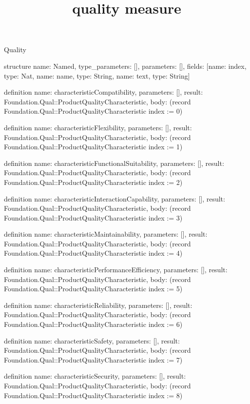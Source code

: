 \begin{lexlean}{Quality}
\title{quality measure}
\begin{semanticmodule}
structure{
  name: Named,
  type_parameters: [],
  parameters: [],
  fields: [{name: index, type: Nat}, {name: name, type: String}, {name: text, type: String}]
}

definition{
  name: characteristicCompatibility,
  parameters: [],
  result: Foundation.Qual::ProductQualityCharacteristic,
  body: (record Foundation.Qual::ProductQualityCharacteristic {index := 0})
}

definition{
  name: characteristicFlexibility,
  parameters: [],
  result: Foundation.Qual::ProductQualityCharacteristic,
  body: (record Foundation.Qual::ProductQualityCharacteristic {index := 1})
}

definition{
  name: characteristicFunctionalSuitability,
  parameters: [],
  result: Foundation.Qual::ProductQualityCharacteristic,
  body: (record Foundation.Qual::ProductQualityCharacteristic {index := 2})
}

definition{
  name: characteristicInteractionCapability,
  parameters: [],
  result: Foundation.Qual::ProductQualityCharacteristic,
  body: (record Foundation.Qual::ProductQualityCharacteristic {index := 3})
}

definition{
  name: characteristicMaintainability,
  parameters: [],
  result: Foundation.Qual::ProductQualityCharacteristic,
  body: (record Foundation.Qual::ProductQualityCharacteristic {index := 4})
}

definition{
  name: characteristicPerformanceEfficiency,
  parameters: [],
  result: Foundation.Qual::ProductQualityCharacteristic,
  body: (record Foundation.Qual::ProductQualityCharacteristic {index := 5})
}

definition{
  name: characteristicReliability,
  parameters: [],
  result: Foundation.Qual::ProductQualityCharacteristic,
  body: (record Foundation.Qual::ProductQualityCharacteristic {index := 6})
}

definition{
  name: characteristicSafety,
  parameters: [],
  result: Foundation.Qual::ProductQualityCharacteristic,
  body: (record Foundation.Qual::ProductQualityCharacteristic {index := 7})
}

definition{
  name: characteristicSecurity,
  parameters: [],
  result: Foundation.Qual::ProductQualityCharacteristic,
  body: (record Foundation.Qual::ProductQualityCharacteristic {index := 8})
}


\end{semanticmodule}
\end{lexlean}
